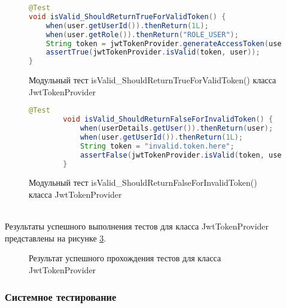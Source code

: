 \begin{figure}[!ht]
	\begin{lstlisting}[language=Java]
@Test
void isValid_ShouldReturnTrueForValidToken() {
	when(user.getUserId()).thenReturn(1L);
	when(user.getRole()).thenReturn("ROLE_USER");
	String token = jwtTokenProvider.generateAccessToken(user);	
	assertTrue(jwtTokenProvider.isValid(token, user));
}
	\end{lstlisting}  
	\caption{Модульный тест isValid\_ShouldReturnTrueForValidToken() класса JwtTokenProvider}
	\label{unitJwtvalid:image}
\end{figure}
\begin{figure}[!ht]
	\begin{lstlisting}[language=Java]
		@Test
		void isValid_ShouldReturnFalseForInvalidToken() {
			when(userDetails.getUser()).thenReturn(user);
			when(user.getUserId()).thenReturn(1L);	
			String token = "invalid.token.here";	
			assertFalse(jwtTokenProvider.isValid(token, user));
		}
	\end{lstlisting}  
\caption{Модульный тест isValid\_ShouldReturnFalseForInvalidToken() класса JwtTokenProvider}
\label{unitJwtinvalid:image}
\end{figure}
\\
Результаты успешного выполнения тестов для класса JwtTokenProvider представлены на рисунке \ref{unitJwtSuc:image}.
\begin{figure}[!ht]
	\caption{Результат успешного прохождения тестов для класса JwtTokenProvider}
	\label{unitJwtSuc:image}
\end{figure}


\subsubsection{Системное тестирование}

